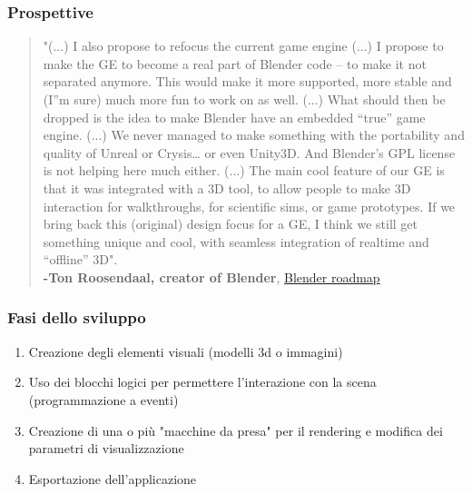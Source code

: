 \documentclass{beamer}
\begin{document}
		\begin{frame}
			\frametitle{Prospettive}
			\begin{quotation}\small 
				"(...) I also propose to refocus the current game engine (...) I propose to make the GE to become a real part of Blender code – to make it not separated anymore. This would make it more supported, more stable and (I”m sure) much more fun to work on as well. (...) What should then be dropped is the idea to make Blender have an embedded “true” game engine. (...) We never managed to make something with the portability and quality of Unreal or Crysis… or even Unity3D. And Blender's GPL license is not helping here much either. (...) The main cool feature of our GE is that it was integrated with a 3D tool, to allow people to make 3D interaction for walkthroughs, for scientific sims, or game prototypes. If we bring back this (original) design focus for a GE, I think we still get something unique and cool, with seamless integration of realtime and “offline” 3D". 
				\\ \textcolor{BlenderOrange}{\textbf{-Ton Roosendaal, creator of Blender}, \href{https://code.blender.org/2013/06/blender-roadmap-2-7-2-8-and-beyond/}{Blender roadmap}} 
			\end{quotation} 
		\end{frame}
		\begin{frame}
			\frametitle{Fasi dello sviluppo}
			\begin{enumerate}
				\item Creazione degli elementi visuali (modelli 3d o immagini)
				\item Uso dei blocchi logici per permettere l'interazione con la scena (programmazione a eventi)
				\item Creazione di una o più "macchine da presa" per il rendering e modifica dei parametri di visualizzazione
				\item Esportazione dell'applicazione
			\end{enumerate}
		\end{frame}
	
\end{document}
